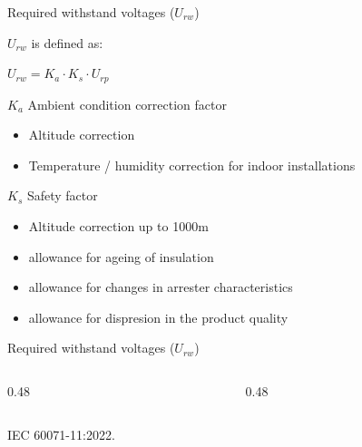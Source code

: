 \begin{frame}{Required withstand voltages ($U_{rw}$)}
  
  $U_{rw}$ is defined as:\\
  {\centering $U_{rw}=K_a \cdot K_s \cdot U_{rp}$\par}
  \vspace{1em}
  
  $K_a$ Ambient condition correction factor
  \begin{itemize}
    \item Altitude correction
    \item Temperature / humidity correction for indoor installations
  \end{itemize}
  \vspace{1em}
  
  $K_s$ Safety factor
  \begin{itemize}
    \item Altitude correction up to 1000m
    \item allowance for ageing of insulation
    \item allowance for changes in arrester characteristics
    \item allowance for dispresion in the product quality
  \end{itemize}

\end{frame}


\begin{frame}{Required withstand voltages ($U_{rw}$)}

  \begin{columns}[c,onlytextwidth]
    \begin{column}{0.48\textwidth}
      \centering
    \end{column}
    \begin{column}{0.48\textwidth}
      \centering
    \end{column}
  \end{columns}
  \vspace{0.3em}
  {\color{atGray}\footnotesize IEC 60071-11:2022.}
\end{frame}

